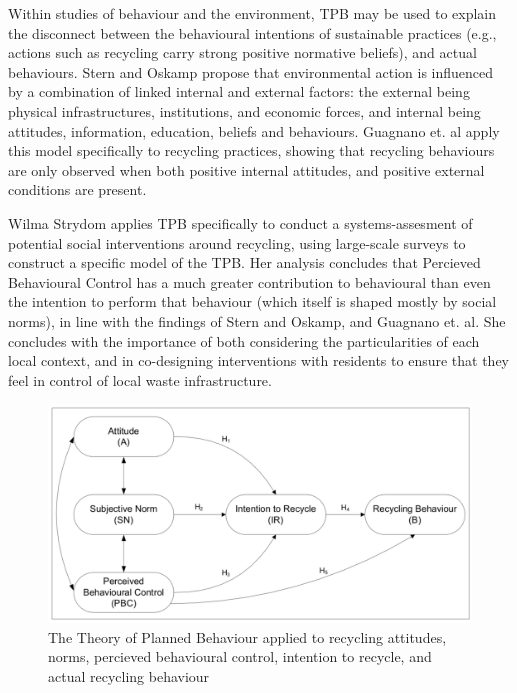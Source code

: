 \documentclass[nofonts,nols,justified,nobib]{tufte-book}
\begin{document}
Within studies of behaviour and the environment, TPB may be used to explain the disconnect between the behavioural intentions of sustainable practices (e.g., actions such as recycling carry strong positive normative beliefs), and actual behaviours. Stern and Oskamp propose that environmental action is influenced by a combination of linked internal and external factors: the external being physical infrastructures, institutions, and economic forces, and internal being attitudes, information, education, beliefs and behaviours\cite{stern_managing_1987}. Guagnano et. al apply this model specifically to recycling practices, showing that recycling behaviours are only observed when both positive internal attitudes, and positive external conditions are present\cite{guagnano_influences_1995}.

Wilma Strydom applies TPB specifically to conduct a systems-assesment of potential social interventions around recycling, using large-scale surveys to construct a specific model of the TPB. Her analysis concludes that Percieved Behavioural Control has a much greater contribution to behavioural than even the intention to perform that behaviour (which itself is shaped mostly by social norms), in line with the findings of Stern and Oskamp, and Guagnano et. al. She concludes with the importance of both considering the particularities of each local context, and in co-designing interventions with residents to ensure that they feel in control of local waste infrastructure. \cite{strydom_applying_2018}

\begin{figure}
\includegraphics[width=\textwidth]{img/1/tpb-recycling.png}
\caption{The Theory of Planned Behaviour applied to recycling attitudes, norms, percieved behavioural control, intention to recycle, and actual recycling behaviour \cite{strydom_applying_2018}}
\end{figure}
\end{document}
